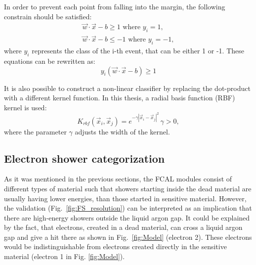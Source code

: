 In order to prevent each point from falling into the margin, the following constrain should be satisfied: 
\begin{eqnarray}
\vec{w}\cdot \vec{x} - b \geqslant 1 \textrm{ where } y_i = 1,\\
\vec{w}\cdot \vec{x} - b \leqslant -1 \textrm{ where } y_i = -1,
\end{eqnarray}
where $y_i$ represents the class of the i-th event, that can be either 1 or -1. These equations can be rewritten as:
\begin{equation}
y_i(\vec{w}\cdot \vec{x} - b ) \geqslant 1
\end{equation}

It is also possible to construct a non-linear classifier by replacing the dot-product with a different kernel function. In this thesis, a radial basis function (RBF) kernel is used:
\begin{equation}\label{eq:RBF}
K_{rbf}(\vec{x}_i, \vec{x}_j) = e^{-\gamma | \vec{x}_i - \vec{x}_j|^2} \, \gamma >0,
\end{equation}
where the parameter $\gamma$ adjusts the width of the kernel.




\subsection{Electron shower categorization}

\begin{figure}[!tbp]
\end{figure}

As it was mentioned in the previous sections, the FCAL modules consist of different types of material such that showers starting inside the dead material are usually having lower energies, than those started in sensitive material. However, the validation (Fig.~\ref{fig:FS_resolution}) can be interpreted as an implication that there are high-energy showers outside the liquid argon gap. It could be explained by the fact, that electrons, created in a dead material, can cross a liquid argon gap and give a hit there as shown in Fig.~\ref{fig:Model} (electron 2). These electrons would be indistinguishable from electrons created directly in the sensitive material (electron 1 in Fig. \ref{fig:Model}). 

